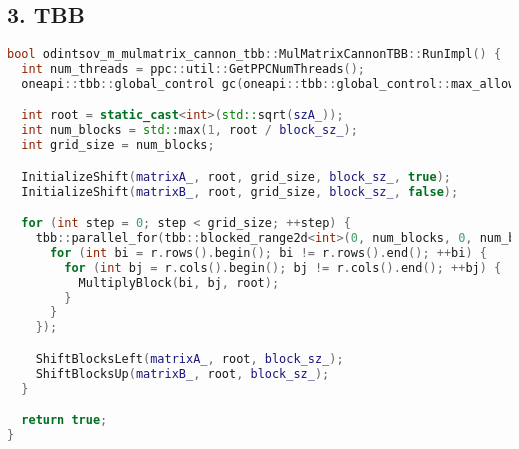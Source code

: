 \documentclass[12pt]{article}
\begin{document}
\subsection*{3. TBB}
\begin{lstlisting}[language=C++,  breaklines=true]
bool odintsov_m_mulmatrix_cannon_tbb::MulMatrixCannonTBB::RunImpl() {
  int num_threads = ppc::util::GetPPCNumThreads();
  oneapi::tbb::global_control gc(oneapi::tbb::global_control::max_allowed_parallelism, num_threads);

  int root = static_cast<int>(std::sqrt(szA_));
  int num_blocks = std::max(1, root / block_sz_);
  int grid_size = num_blocks;

  InitializeShift(matrixA_, root, grid_size, block_sz_, true);
  InitializeShift(matrixB_, root, grid_size, block_sz_, false);

  for (int step = 0; step < grid_size; ++step) {
    tbb::parallel_for(tbb::blocked_range2d<int>(0, num_blocks, 0, num_blocks), [&](const tbb::blocked_range2d<int>& r) {
      for (int bi = r.rows().begin(); bi != r.rows().end(); ++bi) {
        for (int bj = r.cols().begin(); bj != r.cols().end(); ++bj) {
          MultiplyBlock(bi, bj, root);
        }
      }
    });

    ShiftBlocksLeft(matrixA_, root, block_sz_);
    ShiftBlocksUp(matrixB_, root, block_sz_);
  }

  return true;
}

\end{lstlisting}
\end{document}
